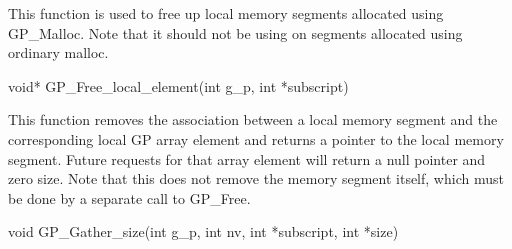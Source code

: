 \documentclass[12pt]{article}
\begin{document}
\local

\begin{desc}

This function is used to free up local memory segments allocated using
GP\_Malloc. Note that it should not be using on segments allocated using ordinary
malloc.

\end{desc}



\begin{capi}
\begin{ccode}
void* GP\_Free\_local\_element(int g\_p, int *subscript)
\begin{funcargs}
\end{funcargs}
\end{ccode}
\end{capi}

\local

\begin{desc}

This function removes the association between a local memory segment and the
corresponding local GP array element and returns a pointer to the local memory
segment. Future requests for that array element
will return a null pointer and zero size. Note that this does not remove the
memory segment itself, which must be done by a separate call to GP\_Free.

\end{desc}



\begin{capi}
\begin{ccode}
void GP\_Gather\_size(int g\_p, int nv, int *subscript, int *size)
\begin{funcargs}
\end{funcargs}
\end{ccode}
\end{capi}
\end{document}
